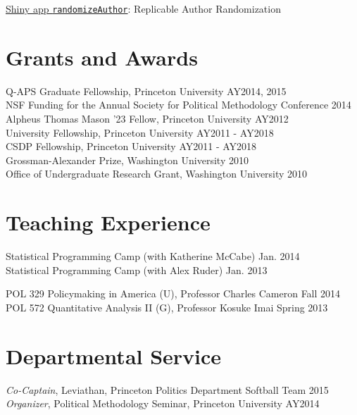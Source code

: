 \documentclass[]{deedy-resume-openfont}
\begin{document}
\href{https://randomizeauthor.shinyapps.io/shiny/}{Shiny app \texttt{randomizeAuthor}}: Replicable Author Randomization
\sectionsep

\section{Grants and Awards}
Q-APS Graduate Fellowship, Princeton University \hfill AY2014, 2015\\
NSF Funding for the Annual Society for Political Methodology Conference \hfill 2014\\
Alpheus Thomas Mason '23 Fellow, Princeton University \hfill AY2012\\
University Fellowship, Princeton University \hfill AY2011 - AY2018\\
CSDP Fellowship, Princeton University \hfill AY2011 - AY2018\\
Grossman-Alexander Prize, Washington University \hfill 2010\\
Office of Undergraduate Research Grant, Washington University \hfill 2010\\
\sectionsep

\section{Teaching Experience}
Statistical Programming Camp (with Katherine McCabe) \hfill Jan. 2014\\
Statistical Programming Camp (with Alex Ruder) \hfill Jan. 2013\\\vspace{2mm}

POL 329 Policymaking in America (U), Professor Charles Cameron \hfill Fall 2014\\
POL 572 Quantitative Analysis II (G), Professor Kosuke Imai \hfill Spring 2013\\
\sectionsep

\section{Departmental Service}
{\it Co-Captain}, Leviathan, Princeton Politics Department Softball Team \hfill 2015\\
{\it Organizer}, Political Methodology Seminar, Princeton University \hfill AY2014\\
\sectionsep
\end{document}
